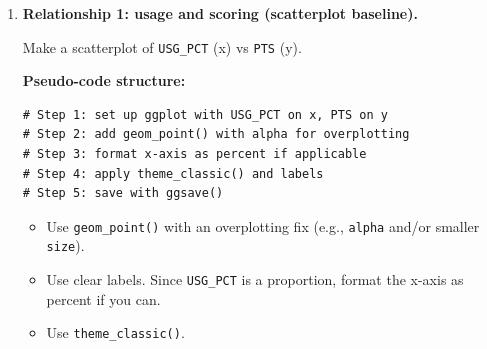 \documentclass[11pt]{article}
\begin{document}
\begin{enumerate}
  \begin{enumerate}
    \item Load the dataset into an object named \texttt{basketball}.
    \item Create a cleaned object named \texttt{basketball\_clean} where you convert the following columns to numeric:
    \[
      \texttt{AGE},\ \texttt{PLAYER\_HEIGHT\_INCHES},\ \texttt{PLAYER\_WEIGHT},\ \texttt{GP},\ \texttt{PTS},\ \texttt{REB},\ \texttt{AST},\ \texttt{NET\_RATING},
    \]
    \[
      \texttt{OREB\_PCT},\ \texttt{DREB\_PCT},\ \texttt{USG\_PCT},\ \texttt{TS\_PCT},\ \texttt{AST\_PCT}.
    \]
    \item Create a simple draft indicator:
    \[
      \texttt{draft\_status} = \text{``Undrafted'' vs ``Drafted''}
    \]
    where ``Drafted'' means \texttt{DRAFT\_YEAR} is not ``Undrafted''.
    \item \textbf{Proof (write-up):} Report:
    \begin{itemize}
      \item the number of rows in \texttt{basketball} and \texttt{basketball\_clean},
      \item a quick summary of at least three numeric columns (e.g., \texttt{AGE}, \texttt{PTS}, \texttt{USG\_PCT}),
      \item one sentence describing how you handled missing or non-numeric values after conversion.
    \end{itemize}
  \end{enumerate}

  \item \textbf{Relationship 1: usage and scoring (scatterplot baseline).}

  Make a scatterplot of \texttt{USG\_PCT} (x) vs \texttt{PTS} (y).

  \textbf{Pseudo-code structure:}
\begin{verbatim}
# Step 1: set up ggplot with USG_PCT on x, PTS on y
# Step 2: add geom_point() with alpha for overplotting
# Step 3: format x-axis as percent if applicable
# Step 4: apply theme_classic() and labels
# Step 5: save with ggsave()
\end{verbatim}

  \begin{itemize}
    \item Use \texttt{geom\_point()} with an overplotting fix (e.g., \texttt{alpha} and/or smaller \texttt{size}).
    \item Use clear labels. Since \texttt{USG\_PCT} is a proportion, format the x-axis as percent if you can.
    \item Use \texttt{theme\_classic()}.
  \end{itemize}


\end{enumerate}
\end{document}
